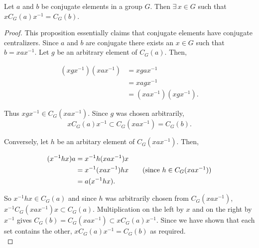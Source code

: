 \begin{proposition}
    \label{conjugate_centralizers_of_IsConj}
    \leanok
    Let $a$ and $b$ be conjugate elements in a group $G$. Then $\exists \, x \in G$ such that $xC_G(a)x^{-1} = C_G(b)$. \vspace{3mm}
\end{proposition}
\begin{proof}
\leanok
This proposition essentially claims that conjugate elements have conjugate centralizers. Since $a$ and $b$ are conjugate there exists an $x \! \in \! G$ such that $b = xax^{-1}$. Let $g$ be an arbitrary element of $C_G(a)$. Then,

\begin{align*} (xgx^{-1})(xax^{-1}) &= xgax^{-1}\\
&= xagx^{-1} \tag{since $g \in C_G(a)$}\\
&= (xax^{-1})(xgx^{-1}). \end{align*}

Thus $xgx^{-1} \in C_G(xax^{-1})$. Since $g$ was chosen arbitrarily, $$xC_G(a)x^{-1} \subset C_G(xax^{-1}) = C_G(b).$$ 

Conversely, let $h$ be an arbitary element of $C_G(xax^{-1})$. Then,

\begin{align*} (x^{-1}hx)a &= x^{-1}h(xax^{-1})x \\
&= x^{-1}(xax^{-1})hx \tag{since $h \in C_G(xax^{-1})$} \\
&= a(x^{-1}hx). \end{align*}

So $x^{-1}hx \in C_G(a)$ and since $h$ was arbitrarily chosen from $C_G(xax^{-1})$, \linebreak $x^{-1}C_G(xax^{-1})x \subset C_G(a)$. Multiplication on the left by $x$ and on the right by $x^{-1}$ gives $C_G(b) =  C_G(xax^{-1}) \subset xC_G(a)x^{-1}$. Since we have shown that each set contains the other, $xC_G(a)x^{-1} = C_G(b)$ as required. \\
\end{proof}
